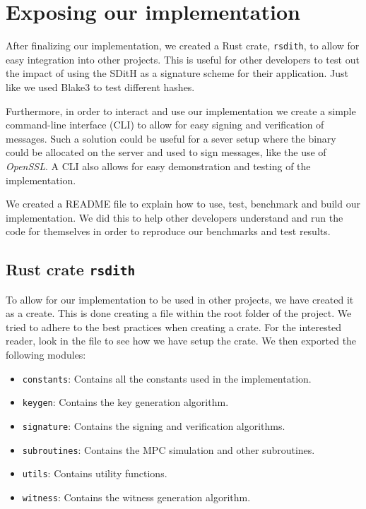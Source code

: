 \documentclass[11pt]{report}
\theoremstyle{definition}
\theoremstyle{plain}
\begin{document}
\section{Exposing our implementation}
After finalizing our implementation, we created a Rust crate, \texttt{rsdith}, to allow for easy integration into other projects. This is useful for other developers to test out the impact of using the SDitH as a signature scheme for their application. Just like we used Blake3 to test different hashes.

Furthermore, in order to interact and use our implementation we create a simple command-line interface (CLI) to allow for easy signing and verification of messages. Such a solution could be useful for a sever setup where the binary could be allocated on the server and used to sign messages, like the use of \textit{OpenSSL}. A CLI also allows for easy demonstration and testing of the implementation.

We created a README file to explain how to use, test, benchmark and build our implementation. We did this to help other developers understand and run the code for themselves in order to reproduce our benchmarks and test results.

\subsection{Rust crate \texttt{rsdith}}
To allow for our implementation to be used in other projects, we have created it as a create. This is done creating a  file within the root folder of the project. We tried to adhere to the best practices when creating a crate. For the interested reader, look in the  file to see how we have setup the crate.
We then exported the following modules:
\begin{itemize}
  \item \texttt{constants}: Contains all the constants used in the implementation.
  \item \texttt{keygen}: Contains the key generation algorithm.
  \item \texttt{signature}: Contains the signing and verification algorithms.
  \item \texttt{subroutines}: Contains the MPC simulation and other subroutines.
  \item \texttt{utils}: Contains utility functions.
  \item \texttt{witness}: Contains the witness generation algorithm.
\end{itemize}
\end{document}
